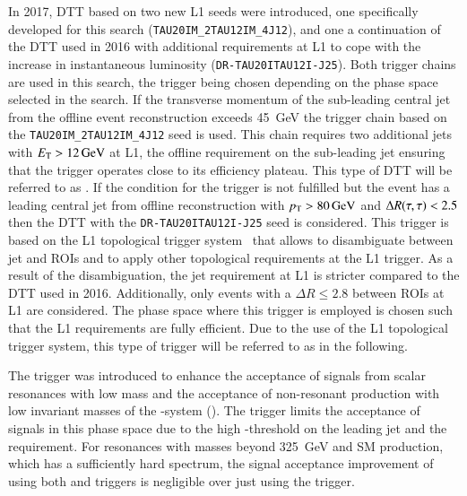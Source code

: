In 2017, DTT based on two new L1 seeds were introduced, one
specifically developed for this search
(\texttt{TAU20IM\_2TAU12IM\_4J12}), and one a continuation of the DTT
used in 2016 with additional requirements at L1 to cope with the
increase in instantaneous luminosity
(\texttt{DR-TAU20ITAU12I-J25}). Both trigger chains are used in this
search, the trigger being chosen depending on the phase space selected
in the search. If the transverse momentum of the sub-leading central
jet from the offline event reconstruction exceeds \SI{45}{\GeV} the
trigger chain based on the \texttt{TAU20IM\_2TAU12IM\_4J12} seed is
used. This chain requires two additional jets with
$\ET > \SI{12}{\GeV}$ at L1, the offline requirement on the
sub-leading jet \pT ensuring that the trigger operates close to its
efficiency plateau. This type of DTT will be referred to as
\FourJTwelve. If the condition for the \FourJTwelve trigger is not
fulfilled but the event has a leading central jet from offline
reconstruction with $\pT > \SI{80}{\GeV}$ and $\Delta R(\tau, \tau) < 2.5$ then
the DTT with the \texttt{DR-TAU20ITAU12I-J25} seed is considered. This
trigger is based on the L1 topological trigger
system~\cite{TRIG-2019-02} that allows to disambiguate between jet and
\tauhadvis ROIs and to apply other topological requirements at the L1
trigger. As a result of the disambiguation, the jet requirement at L1
is stricter compared to the DTT used in 2016. Additionally, only
events with a $\Delta R \leq \num{2.8}$ between \tauhadvis ROIs at L1
are considered. The phase space where this trigger is employed is
chosen such that the L1 requirements are fully efficient. Due to the
use of the L1 topological trigger system, this type of trigger will be
referred to as \LOneTopo in the following.

The \FourJTwelve trigger was introduced to enhance the acceptance of
signals from scalar resonances with low mass and the acceptance of
non-resonant \HH production with low invariant masses of the
\HH-system (\mHH). The \LOneTopo trigger limits the acceptance of
signals in this phase space due to the high \pT-threshold on the
leading jet and the \dRtautau requirement. For resonances with masses
beyond \SI{325}{\GeV} and SM \HH production, which has a sufficiently
hard \mHH spectrum, the signal acceptance improvement of using both
\FourJTwelve and \LOneTopo triggers is negligible over just using the
\LOneTopo trigger.

